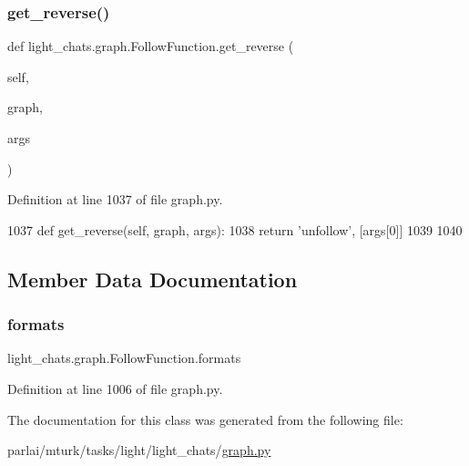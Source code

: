 \subsubsection{\texorpdfstring{get\+\_\+reverse()}{get\_reverse()}}
{\footnotesize\ttfamily def light\+\_\+chats.\+graph.\+Follow\+Function.\+get\+\_\+reverse (\begin{DoxyParamCaption}\item[{}]{self,  }\item[{}]{graph,  }\item[{}]{args }\end{DoxyParamCaption})}



Definition at line 1037 of file graph.\+py.


\begin{DoxyCode}
1037     \textcolor{keyword}{def }get\_reverse(self, graph, args):
1038         \textcolor{keywordflow}{return} \textcolor{stringliteral}{'unfollow'}, [args[0]]
1039 
1040 
\end{DoxyCode}


\subsection{Member Data Documentation}
\mbox{\label{classlight__chats_1_1graph_1_1FollowFunction_a3d3473d546a129f03d497102b10ea2a9}} 
\subsubsection{\texorpdfstring{formats}{formats}}
{\footnotesize\ttfamily light\+\_\+chats.\+graph.\+Follow\+Function.\+formats}



Definition at line 1006 of file graph.\+py.



The documentation for this class was generated from the following file\+:\begin{DoxyCompactItemize}
\item 
parlai/mturk/tasks/light/light\+\_\+chats/\hyperlink{parlai_2mturk_2tasks_2light_2light__chats_2graph_8py}{graph.\+py}\end{DoxyCompactItemize}
